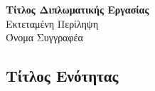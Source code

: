 \documentclass{article}
\begin{document}
\begin{center}
    {\Large \textbf{Τίτλος Διπλωματικής Εργασίας}}\\[2cm]
    {\large Εκτεταμένη Περίληψη\\[0.5cm]
    Όνομα Συγγραφέα}
\end{center}

\vspace{5cm}

\begin{multicols}{2}

\section{Τίτλος Ενότητας}

\lipsum[1-5]

\end{multicols}
\end{document}
